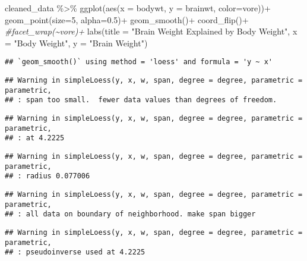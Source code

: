 \documentclass[
]{article}
\newenvironment{Shaded}{\begin{snugshade}}{\end{snugshade}}
\newcommand{\AttributeTok}[1]{\textcolor[rgb]{0.77,0.63,0.00}{#1}}
\newcommand{\CommentTok}[1]{\textcolor[rgb]{0.56,0.35,0.01}{\textit{#1}}}
\newcommand{\DecValTok}[1]{\textcolor[rgb]{0.00,0.00,0.81}{#1}}
\newcommand{\FloatTok}[1]{\textcolor[rgb]{0.00,0.00,0.81}{#1}}
\newcommand{\FunctionTok}[1]{\textcolor[rgb]{0.00,0.00,0.00}{#1}}
\newcommand{\NormalTok}[1]{#1}
\newcommand{\SpecialCharTok}[1]{\textcolor[rgb]{0.00,0.00,0.00}{#1}}
\newcommand{\StringTok}[1]{\textcolor[rgb]{0.31,0.60,0.02}{#1}}
\begin{document}
\begin{Shaded}
\begin{Highlighting}[]
\NormalTok{cleaned\_data }\SpecialCharTok{\%\textgreater{}\%} 
  \FunctionTok{ggplot}\NormalTok{(}\FunctionTok{aes}\NormalTok{(}\AttributeTok{x =}\NormalTok{ bodywt,}
             \AttributeTok{y =}\NormalTok{ brainwt,}
             \AttributeTok{color=}\NormalTok{vore))}\SpecialCharTok{+}
  \FunctionTok{geom\_point}\NormalTok{(}\AttributeTok{size=}\DecValTok{5}\NormalTok{, }\AttributeTok{alpha=}\FloatTok{0.5}\NormalTok{)}\SpecialCharTok{+}
  \FunctionTok{geom\_smooth}\NormalTok{()}\SpecialCharTok{+}
  \FunctionTok{coord\_flip}\NormalTok{()}\SpecialCharTok{+}
  \CommentTok{\#facet\_wrap(\textasciitilde{}vore)+}
  \FunctionTok{labs}\NormalTok{(}\AttributeTok{title =} \StringTok{"Brain Weight Explained by Body Weight"}\NormalTok{,}
       \AttributeTok{x =} \StringTok{"Body Weight"}\NormalTok{,}
       \AttributeTok{y =} \StringTok{"Brain Weight"}\NormalTok{)}
\end{Highlighting}
\end{Shaded}

\begin{verbatim}
## `geom_smooth()` using method = 'loess' and formula = 'y ~ x'
\end{verbatim}

\begin{verbatim}
## Warning in simpleLoess(y, x, w, span, degree = degree, parametric = parametric,
## : span too small.  fewer data values than degrees of freedom.
\end{verbatim}

\begin{verbatim}
## Warning in simpleLoess(y, x, w, span, degree = degree, parametric = parametric,
## : at 4.2225
\end{verbatim}

\begin{verbatim}
## Warning in simpleLoess(y, x, w, span, degree = degree, parametric = parametric,
## : radius 0.077006
\end{verbatim}

\begin{verbatim}
## Warning in simpleLoess(y, x, w, span, degree = degree, parametric = parametric,
## : all data on boundary of neighborhood. make span bigger
\end{verbatim}

\begin{verbatim}
## Warning in simpleLoess(y, x, w, span, degree = degree, parametric = parametric,
## : pseudoinverse used at 4.2225
\end{verbatim}
\end{document}
